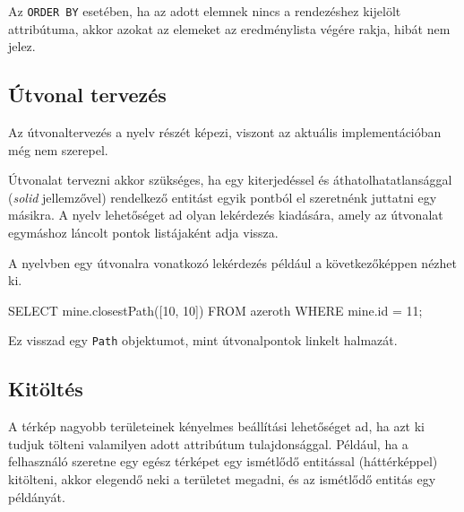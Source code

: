 Az \texttt{ORDER BY} esetében, ha az adott elemnek nincs a rendezéshez kijelölt attribútuma, akkor azokat az elemeket az eredménylista végére rakja, hibát nem jelez.

\subsection{Útvonal tervezés}

Az útvonaltervezés a nyelv részét képezi, viszont az aktuális implementációban még nem szerepel.

Útvonalat tervezni akkor szükséges, ha egy kiterjedéssel és áthatolhatatlansággal (\textit{solid} jellemzővel) rendelkező entitást egyik pontból el szeretnénk juttatni egy másikra. A nyelv lehetőséget ad olyan lekérdezés kiadására, amely az útvonalat egymáshoz láncolt pontok listájaként adja vissza.

A nyelvben egy útvonalra vonatkozó lekérdezés például a következőképpen nézhet ki.
\begin{sql}
SELECT mine.closestPath([10, 10])
FROM azeroth WHERE mine.id = 11;
\end{sql}
Ez visszad egy \texttt{Path} objektumot, mint útvonalpontok linkelt halmazát.

\subsection{Kitöltés}

A térkép nagyobb területeinek kényelmes beállítási lehetőséget ad, ha azt ki tudjuk tölteni valamilyen adott attribútum tulajdonsággal. Például, ha a felhasználó szeretne egy egész térképet egy ismétlődő entitással (háttérképpel) kitölteni, akkor elegendő neki a területet megadni, és az ismétlődő entitás egy példányát.
